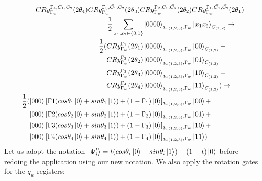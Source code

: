 \documentclass{article}
\begin{document}
\begin{equation}
   \resizebox{.9\hsize}{!}{$\begin{split}
        CRy_{\Gamma_w}^{\Gamma_4,C_1,C_2}(2\theta_4)CRy_{\Gamma_w}^{\Gamma_3,\bar{C_1},C_2}(2\theta_3)CRy_{\Gamma_w}^{\Gamma_2,C_1,\bar{C_2}}(2\theta_2)&CRy_{\Gamma_w}^{\Gamma_1,\bar{C_1},\bar{C_2}}(2\theta_1)\\
        \frac{1}{2}\sum_{x_1,x_2\in\{0,1\}}\ket{0000}_{q_{w(1,2,3)},\Gamma_w}&\ket{ x_1x_2}_{C_{(1,2)}}\to\\
        \frac{1}{2}(
        CRy_{\Gamma_w}^{\Gamma_1}(2\theta_1)\ket{0000}_{q_{w(1,2,3)},\Gamma_w}&\ket{ 00}_{C_{(1,2)}}+\\
        CRy_{\Gamma_w}^{\Gamma_2}(2\theta_2)\ket{0000}_{q_{w(1,2,3)},\Gamma_w}&\ket{ 01}_{C_{(1,2)}}+\\
        CRy_{\Gamma_w}^{\Gamma_3}(2\theta_3)\ket{0000}_{q_{w(1,2,3)},\Gamma_w}&\ket{ 10}_{C_{(1,2)}}+\\
        CRy_{\Gamma_w}^{\Gamma_4}(2\theta_4)\ket{0000}_{q_{w(1,2,3)},\Gamma_w}&\ket{ 11}_{C_{(1,2)}})\to\\
        \frac{1}{2}(
        \ket{000}[\Gamma1(cos\theta_1\ket{0}+sin\theta_1\ket{1})+(1-\Gamma_1)\ket{0}]_{q_{w(1,2,3)},\Gamma_w}&\ket{ 00}+\\
        \ket{000}[\Gamma2(cos\theta_2\ket{0}+sin\theta_2\ket{1})+(1-\Gamma_2)\ket{0}]_{q_{w(1,2,3)},\Gamma_w}&\ket{ 01}+\\
        \ket{000}[\Gamma3(cos\theta_3\ket{0}+sin\theta_3\ket{1})+(1-\Gamma_3)\ket{0}]_{q_{w(1,2,3)},\Gamma_w}&\ket{ 10}+\\
        \ket{000}[\Gamma4(cos\theta_4\ket{0}+sin\theta_4\ket{1})+(1-\Gamma_4)\ket{0}]_{q_{w(1,2,3)},\Gamma_w}&\ket{ 11}
        )
   \end{split}$}
\end{equation}
Let us adopt the notation $\ket{\Psi^t_i}=t(cos\theta_i\ket{0}+sin\theta_i\ket{1})+(1-t)\ket{0}$ before redoing the application using our new notation. We also apply the rotation gates for the $q_w$ registers:
\end{document}
